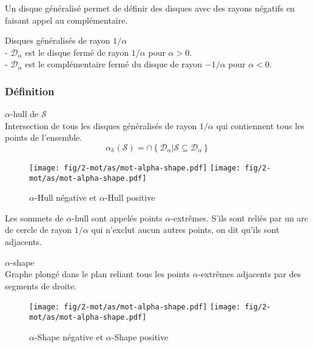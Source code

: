 Un disque généralisé permet de définir des disques avec des rayons négatifs en faisant appel au complémentaire.

\begin{Definition}{Disques généralisés de rayon $1/\alpha$}\\
\label{def:dis-gen}
   \noindent - $\mathcal{D}_{\alpha}$ est le disque fermé de rayon $1/\alpha$ pour $\alpha > 0$.\\
   \noindent - $\mathcal{D}_{\alpha}$ est le complémentaire fermé du disque de rayon $- 1/\alpha$ pour $\alpha < 0$.
\end{Definition}

\subsubsection{Définition}

\begin{Definition}{$\alpha$-hull de $\mathcal{S}$}\\
\label{def:ah-txt}
    Intersection de tous les disques généralisés de rayon $1/\alpha$ qui contiennent tous les points de l'ensemble.
    $$ \alpha_h(\mathcal{S}) = \cap \left\{ \mathcal{D}_{\alpha} | \mathcal{S} \subseteq \mathcal{D}_{\alpha} \right\}$$
\end{Definition}

\begin{figure}[H]
  \centering
  \texttt{[image: fig/2-mot/as/mot-alpha-shape.pdf]}
  \texttt{[image: fig/2-mot/as/mot-alpha-shape.pdf]}
  \caption{$\alpha$-Hull négative et $\alpha$-Hull positive }
\end{figure}
  
Les sommets de $\alpha$-hull sont appelés points $\alpha$-extrêmes. S'ils sont reliés par un arc de cercle de rayon $1/ \alpha$ qui n'exclut aucun autres points, on dit qu'ils sont adjacents.

\begin{Definition}{$\alpha$-shape}\\
\label{def:as}
      Graphe plongé dans le plan reliant tous les points $\alpha$-extrêmes adjacents par des segments de droite.
\end{Definition}

\begin{figure}[H]
  \centering
  \texttt{[image: fig/2-mot/as/mot-alpha-shape.pdf]}
  \texttt{[image: fig/2-mot/as/mot-alpha-shape.pdf]}
  \caption{$\alpha$-Shape négative et $\alpha$-Shape positive }
\end{figure}


